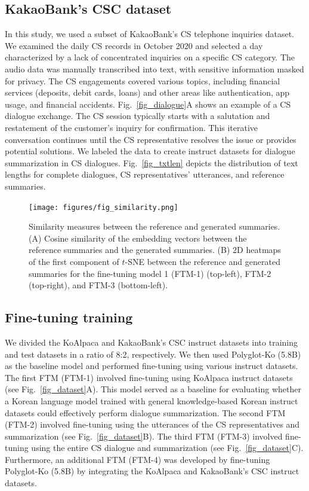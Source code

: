 \documentclass[sigconf]{acmart}
\begin{document}
\subsection{KakaoBank's CSC dataset}
In this study, we used a subset of KakaoBank's CS telephone inquiries dataset. We examined the daily CS records in October 2020 and selected a day characterized by a lack of concentrated inquiries on a specific CS category. The audio data was manually transcribed into text, with sensitive information masked for privacy. The CS engagements covered various topics, including financial services (deposits, debit cards, loans) and other areas like authentication, app usage, and financial accidents. Fig.~\ref{fig_dialogue}A shows an example of a CS dialogue exchange. The CS session typically starts with a salutation and restatement of the customer's inquiry for confirmation. This iterative conversation continues until the CS representative resolves the issue or provides potential solutions. We labeled the data to create instruct datasets for dialogue summarization in CS dialogues. Fig.~\ref{fig_txtlen} depicts the distribution of text lengths for complete dialogues, CS representatives' utterances, and reference summaries.





\begin{figure}[t!]
  \centering
  \texttt{[image: figures/fig\_similarity.png]}
  \caption{Similarity measures between the reference and generated summaries. (A) Cosine similarity of the embedding vectors between the reference summaries and the generated summaries. (B) 2D heatmaps of the first component of $t$-SNE between the reference and generated summaries for the fine-tuning model 1 (FTM-1) (top-left), FTM-2 (top-right), and FTM-3 (bottom-left).
  }
\label{fig_similarity}
\end{figure}



\subsection{Fine-tuning training}
We divided the KoAlpaca and KakaoBank's CSC instruct datasets into training and test datasets in a ratio of 8:2, respectively. We then used Polyglot-Ko (5.8B) as the baseline model and performed  fine-tuning using various instruct datasets. The first FTM (FTM-1) involved fine-tuning using KoAlpaca instruct datasets (see Fig.~\ref{fig_dataset}A). This model served as a baseline for evaluating whether a Korean language model trained with general knowledge-based Korean instruct datasets could effectively perform dialogue summarization. The second FTM (FTM-2) involved fine-tuning using the utterances of the CS representatives and summarization (see Fig.~\ref{fig_dataset}B). The third FTM (FTM-3) involved fine-tuning using the entire CS dialogue and summarization (see Fig.~\ref{fig_dataset}C). Furthermore, an additional FTM (FTM-4) was developed by fine-tuning Polyglot-Ko (5.8B) by integrating the KoAlpaca and KakaoBank's CSC instruct datasets.
\end{document}

